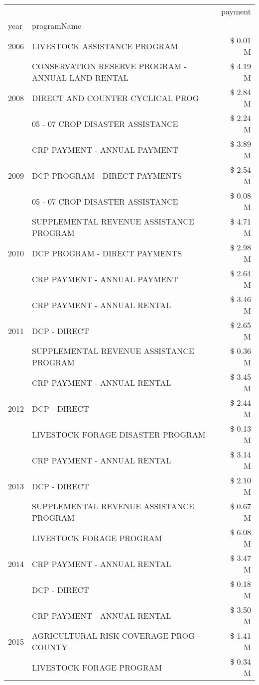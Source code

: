 \begin{tabular}{llr}
\toprule
 &  & payment \\
year & programName &  \\
\midrule
2006 & LIVESTOCK ASSISTANCE PROGRAM & \$ 0.01 M \\
\cline{1-3}
\multirow[t]{3}{*}{2008} & CONSERVATION RESERVE PROGRAM - ANNUAL LAND RENTAL & \$ 4.19 M \\
 & DIRECT AND COUNTER CYCLICAL PROG & \$ 2.84 M \\
 & 05 - 07 CROP DISASTER ASSISTANCE & \$ 2.24 M \\
\cline{1-3}
\multirow[t]{3}{*}{2009} & CRP PAYMENT - ANNUAL PAYMENT & \$ 3.89 M \\
 & DCP PROGRAM - DIRECT PAYMENTS & \$ 2.54 M \\
 & 05 - 07 CROP DISASTER ASSISTANCE & \$ 0.08 M \\
\cline{1-3}
\multirow[t]{3}{*}{2010} & SUPPLEMENTAL REVENUE ASSISTANCE PROGRAM & \$ 4.71 M \\
 & DCP PROGRAM - DIRECT PAYMENTS & \$ 2.98 M \\
 & CRP PAYMENT - ANNUAL PAYMENT & \$ 2.64 M \\
\cline{1-3}
\multirow[t]{3}{*}{2011} & CRP PAYMENT - ANNUAL RENTAL & \$ 3.46 M \\
 & DCP - DIRECT & \$ 2.65 M \\
 & SUPPLEMENTAL REVENUE ASSISTANCE PROGRAM & \$ 0.36 M \\
\cline{1-3}
\multirow[t]{3}{*}{2012} & CRP PAYMENT - ANNUAL RENTAL & \$ 3.45 M \\
 & DCP - DIRECT & \$ 2.44 M \\
 & LIVESTOCK FORAGE DISASTER PROGRAM & \$ 0.13 M \\
\cline{1-3}
\multirow[t]{3}{*}{2013} & CRP PAYMENT - ANNUAL RENTAL & \$ 3.14 M \\
 & DCP - DIRECT & \$ 2.10 M \\
 & SUPPLEMENTAL REVENUE ASSISTANCE PROGRAM & \$ 0.67 M \\
\cline{1-3}
\multirow[t]{3}{*}{2014} & LIVESTOCK FORAGE PROGRAM & \$ 6.08 M \\
 & CRP PAYMENT - ANNUAL RENTAL & \$ 3.47 M \\
 & DCP - DIRECT & \$ 0.18 M \\
\cline{1-3}
\multirow[t]{3}{*}{2015} & CRP PAYMENT - ANNUAL RENTAL & \$ 3.50 M \\
 & AGRICULTURAL RISK COVERAGE PROG - COUNTY & \$ 1.41 M \\
 & LIVESTOCK FORAGE PROGRAM & \$ 0.34 M \\

\end{tabular}
